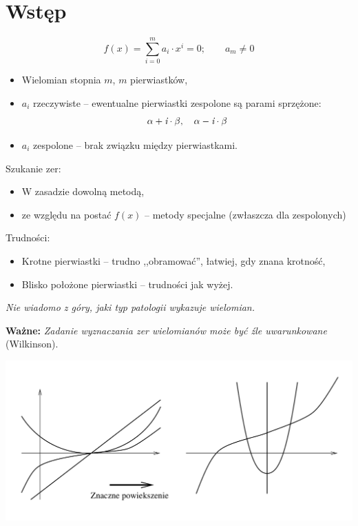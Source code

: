 \section{Wstęp}

\begin{frame}
  $$ f(x) = \sum_{i=0}^m a_i \cdot x^i = 0; \qquad a_m \neq 0 $$

  \begin{itemize}
    \item Wielomian stopnia $m$, $m$ pierwiastków,
    \item $a_i$ rzeczywiste -- ewentualne pierwiastki zespolone są parami sprzężone:
    $$ \alpha + \textit{\textrm{i}} \cdot \beta, \quad \alpha - \textit{\textrm{i}} \cdot \beta $$
    \item $a_i$ zespolone -- brak związku między pierwiastkami.
  \end{itemize}
\end{frame}

\begin{frame}
  Szukanie zer:
  \begin{itemize}
    \item W zasadzie dowolną metodą,
    \item ze względu na postać $f(x)$ -- metody specjalne (zwłaszcza dla zespolonych)
  \end{itemize}

  Trudności:
  \begin{itemize}
    \item Krotne pierwiastki -- trudno ,,obramować'', łatwiej, gdy znana krotność,
    \item Blisko położone pierwiastki -- trudności jak wyżej.
  \end{itemize}

  \textit{Nie wiadomo z góry, jaki typ patologii wykazuje wielomian.}

  \vspace{5px}

  \textbf{Ważne:} \textit{Zadanie wyznaczania zer wielomianów może być źle uwarunkowane} (Wilkinson).
\end{frame}

\begin{frame}
  \includegraphics[width=\textwidth]{img/8/wielomian}
\end{frame}
